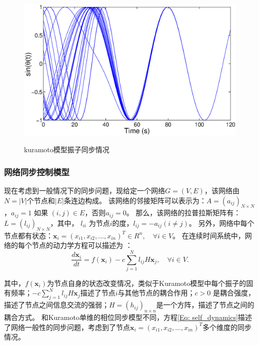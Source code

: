 \begin{figure}[ht]%
	\centering
	\includegraphics[width=0.9\columnwidth]{chapter2Fig/kuramoto}\\
	\caption{kuramoto模型振子同步情况}
	\label{Fig: kuramoto}	
	
\end{figure}



\subsubsection{网络同步控制模型}
\label{Sec: control}
现在考虑到一般情况下的同步问题，现给定一个网络$ G = (V, E) $，该网络由$ N=|V| $个节点和$ |E| $条连边构成。
该网络的邻接矩阵可以表示为：$ A=(a_{ij})_{N\times N} $，$a_{ij}=1$ 如果 $(i,j)\in E$，否则$a_{ij}=0$。
那么，该网络的拉普拉斯矩阵有：$ L=(l_{ij})_{N \times N}$，其中， $ l_{ii} $ 为节点$ i $的度，$ l_{ij}=-a_{ij} (i \neq j) $。
另外，网络中每个节点都有状态：$ \textbf{x}_i =(x_{i1},x_{i2},...,x_{in})^T \in R^n, \quad \forall i\in V $。
在连续时间系统中，网络的每个节点的动力学方程可以描述为 \cite{汪小帆2006}：
\begin{equation}
\frac{d\textbf{x}_i}{dt} = f(\textbf{x}_i)-c\sum_{j = 1}^{N}l_{ij}H\textbf{x}_j,\quad \forall i\in V.
\label{Eq: self_dynamics}
\end{equation}

其中，$ f(\textbf{x}_i) $为节点自身的状态改变情况，类似于Kuramoto模型中每个振子的固有频率；$ -c\sum_{j = 1}^{N}l_{ij}H\textbf{x}_j $描述了节点$ i $与其他节点的耦合作用；$ c>0 $ 是耦合强度，描述了节点之间信息交流的强弱；$ H=(h_{ij})_{n \times n} $是一个方阵，描述了节点之间的耦合方式。
和Kuramoto单维的相位同步模型不同，方程\ref{Eq: self_dynamics}描述了网络一般性的同步问题，考虑到了节点$ \textbf{x}_i =(x_{i1},x_{i2},...,x_{in})^T $多个维度的同步情况。

